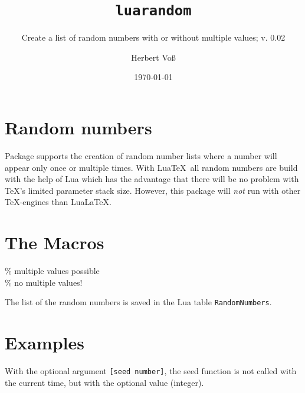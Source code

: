 \documentclass[fontsize=11pt,english,BCOR=10mm,DIV=12,bibliography=totoc,parskip=false,
   headings=small, headinclude=false,footinclude=false,oneside,abstract=on]{pst-doc}
\begin{document}
\title{\texttt{luarandom}}
\subtitle{Create a list of random numbers with or without multiple values; v. 0.02}
\author{Herbert Vo\ss}
\date{\today}
\maketitle

\tableofcontents


\section{Random numbers}
Package  supports the creation of random number lists where a number will
appear only once or multiple times. With Lua\TeX\ all random numbers are build with the help of Lua which
has the advantage that there will be no problem with \TeX's limited parameter stack size.
However, this package will \emph{not}  run with other \TeX-engines than Lua\LaTeX.


\section{The Macros}
\begin{BDef}
\% multiple values possible\\
 \% no multiple values!\\
\end{BDef}


The list of the random numbers is saved in the Lua table \texttt{RandomNumbers}. 


\section{Examples}


\begin{LTXexample}[pos=t]
\small
{}%

\end{LTXexample}


With the optional argument \verb|[seed number]|, the seed function is not called
with the current time, but with the optional value (integer).
\end{document}
